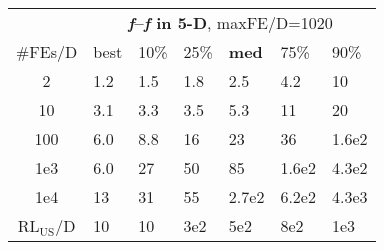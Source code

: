 \begin{tabular}{c|llllll}
 & \multicolumn{6}{|c}{\textbf{\textit{f}\raisebox{-0.35ex}{1}--\textit{f}\raisebox{-0.35ex}{24} in 5-D}, maxFE/D=1020}\\
\#FEs/D & best & 10\% & 25\% & \textbf{med} & 75\% & 90\%\\
2 & \hspace*{1ex}1.2 & \hspace*{1ex}1.5 & \hspace*{1ex}1.8 & \hspace*{1ex}2.5 & \hspace*{1ex}4.2 & 10\\
10 & \hspace*{1ex}3.1 & \hspace*{1ex}3.3 & \hspace*{1ex}3.5 & \hspace*{1ex}5.3 & 11 & 20\\
100 & \hspace*{1ex}6.0 & \hspace*{1ex}8.8 & 16 & 23 & 36 & 1.6e2\\
1e3 & \hspace*{1ex}6.0 & 27 & 50 & 85 & 1.6e2 & 4.3e2\\
1e4 & 13 & 31 & 55 & 2.7e2 & 6.2e2 & 4.3e3\\
$\text{RL}_{\text{US}}$/D & 10 & 10 & 3e2 & 5e2 & 8e2 & 1e3
\end{tabular}
